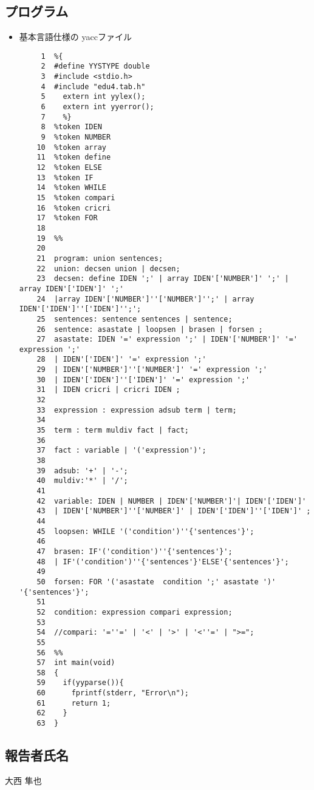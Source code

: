 \documentclass[a4j]{jarticle}
\begin{document}
\subsection*{プログラム}
\begin{itemize}
\item 基本言語仕様の yaccファイル
\begin{verbatim}
     1	%{
     2	#define YYSTYPE double
     3	#include <stdio.h>
     4	#include "edu4.tab.h"
     5	  extern int yylex();
     6	  extern int yyerror();
     7	  %}
     8	%token IDEN 
     9	%token NUMBER
    10	%token array
    11	%token define
    12	%token ELSE
    13	%token IF
    14	%token WHILE
    15	%token compari
    16	%token cricri
    17	%token FOR
    18	
    19	%%
    20	
    21	program: union sentences;
    22	union: decsen union | decsen;
    23	decsen: define IDEN ';' | array IDEN'['NUMBER']' ';' | array IDEN'['IDEN']' ';'
    24	|array IDEN'['NUMBER']''['NUMBER']'';' | array IDEN'['IDEN']''['IDEN']'';';
    25	sentences: sentence sentences | sentence;
    26	sentence: asastate | loopsen | brasen | forsen ;
    27	asastate: IDEN '=' expression ';' | IDEN'['NUMBER']' '=' expression ';' 
    28	| IDEN'['IDEN']' '=' expression ';'
    29	| IDEN'['NUMBER']''['NUMBER']' '=' expression ';'
    30	| IDEN'['IDEN']''['IDEN']' '=' expression ';'
    31	| IDEN cricri | cricri IDEN ;
    32	
    33	expression : expression adsub term | term;
    34	
    35	term : term muldiv fact | fact;
    36	
    37	fact : variable | '('expression')';
    38	
    39	adsub: '+' | '-';
    40	muldiv:'*' | '/';
    41	
    42	variable: IDEN | NUMBER | IDEN'['NUMBER']'| IDEN'['IDEN']'
    43	| IDEN'['NUMBER']''['NUMBER']' | IDEN'['IDEN']''['IDEN']' ;
    44	
    45	loopsen: WHILE '('condition')''{'sentences'}';
    46	
    47	brasen: IF'('condition')''{'sentences'}';
    48	| IF'('condition')''{'sentences'}'ELSE'{'sentences'}';
    49	
    50	forsen: FOR '('asastate  condition ';' asastate ')' '{'sentences'}';
    51	
    52	condition: expression compari expression;
    53	
    54	//compari: '=''=' | '<' | '>' | '<''=' | ">=";
    55	
    56	%%
    57	int main(void)
    58	{
    59	  if(yyparse()){
    60	    fprintf(stderr, "Error\n");
    61	    return 1;
    62	  }
    63	}
\end{verbatim}
\end{itemize}

\subsection*{報告者氏名}
大西 隼也
\end{document}
